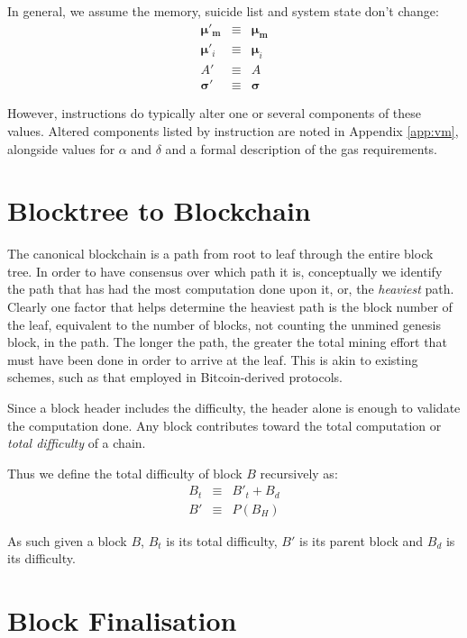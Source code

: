 \documentclass[9pt,oneside]{amsart}
\begin{document}
\begin{multicols}{2}
In general, we assume the memory, suicide list and system state don't change:
\begin{eqnarray}
\boldsymbol{\mu}'_\mathbf{m} & \equiv & \boldsymbol{\mu}_\mathbf{m} \\
\boldsymbol{\mu}'_i & \equiv & \boldsymbol{\mu}_i \\
A' & \equiv & A \\
\boldsymbol{\sigma}' & \equiv & \boldsymbol{\sigma}
\end{eqnarray}

However, instructions do typically alter one or several components of these values. Altered components listed by instruction are noted in Appendix \ref{app:vm}, alongside values for $\alpha$ and $\delta$ and a formal description of the gas requirements.

\section{Blocktree to Blockchain} \label{ch:ghost}

The canonical blockchain is a path from root to leaf through the entire block tree. In order to have consensus over which path it is, conceptually we identify the path that has had the most computation done upon it, or, the \textit{heaviest} path. Clearly one factor that helps determine the heaviest path is the block number of the leaf, equivalent to the number of blocks, not counting the unmined genesis block, in the path. The longer the path, the greater the total mining effort that must have been done in order to arrive at the leaf. This is akin to existing schemes, such as that employed in Bitcoin-derived protocols.

Since a block header includes the difficulty, the header alone is enough to validate the computation done. Any block contributes toward the total computation or \textit{total difficulty} of a chain.

Thus we define the total difficulty of block $B$ recursively as:
\begin{eqnarray}
B_t & \equiv & B'_t + B_d \\
B' & \equiv & P(B_H)
\end{eqnarray}

As such given a block $B$, $B_t$ is its total difficulty, $B'$ is its parent block and $B_d$ is its difficulty.

\section{Block Finalisation} \label{ch:finalisation}


\end{multicols}
\end{document}

